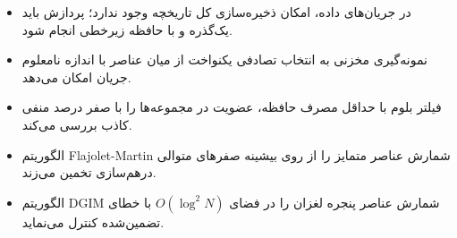 \begin{summarybox}
\begin{itemize}
    \item در جریان‌های داده، امکان ذخیره‌سازی کل تاریخچه وجود ندارد؛ پردازش باید یک‌گذره و با حافظه زیرخطی انجام شود.
    \item نمونه‌گیری مخزنی به انتخاب تصادفی یکنواخت از میان عناصر با اندازه نامعلوم جریان امکان می‌دهد.
    \item فیلتر بلوم با حداقل مصرف حافظه، عضویت در مجموعه‌ها را با صفر درصد منفی کاذب بررسی می‌کند.
    \item الگوریتم Flajolet-Martin شمارش عناصر متمایز را از روی بیشینه صفرهای متوالی درهم‌سازی تخمین می‌زند.
    \item الگوریتم DGIM شمارش عناصر پنجره لغزان را در فضای $O(\log^2 N)$ با خطای تضمین‌شده کنترل می‌نماید.
\end{itemize}
\end{summarybox}
